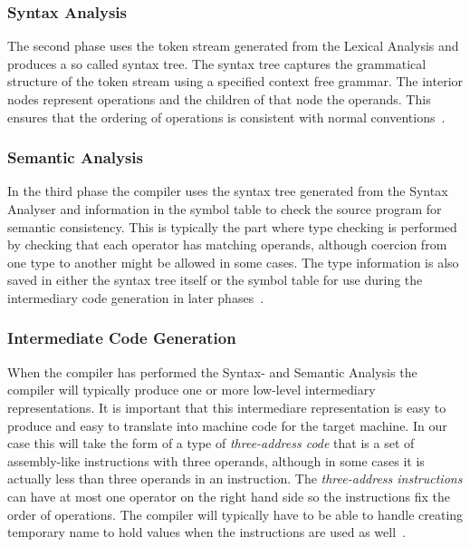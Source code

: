 \documentclass{sigchi}
\begin{document}
\subsubsection{Syntax Analysis}
The second phase uses the token stream generated from the Lexical Analysis and produces a so called syntax tree. The syntax tree captures the grammatical structure of the token stream using a specified context free grammar. The interior nodes represent operations and the children of that node the operands. This ensures that the ordering of operations is consistent with normal conventions~\cite{dragon}.



\subsubsection{Semantic Analysis}
In the third phase the compiler uses the syntax tree generated from the Syntax Analyser and information in the symbol table to check the source program for semantic consistency. This is typically the part where type checking is performed by checking that each operator has matching operands, although coercion from one type to another might be allowed in some cases. The type information is also saved in either the syntax tree itself or the symbol table for use during the intermediary code generation in later phases~\cite{dragon}.

\subsubsection{Intermediate Code Generation}
When the compiler has performed the Syntax- and Semantic Analysis the compiler will typically produce one or more low-level intermediary representations. It is important that this intermediare representation is easy to produce and easy to translate into machine code for the target machine. In our case this will take the form of a type of \emph{three-address code} that is a set of assembly-like instructions with three operands, although in some cases it is actually less than three operands in an instruction. The \emph{three-address instructions} can have at most one operator on the right hand side so the instructions fix the order of operations. The compiler will typically have to be able to handle creating temporary name to hold values when the instructions are used as well~\cite{dragon}.
\end{document}
